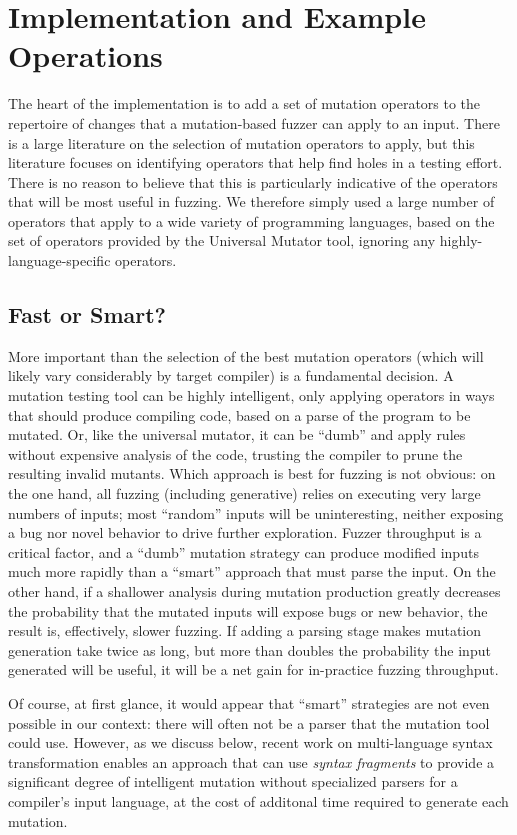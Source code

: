 \section{Implementation and Example Operations}

The heart of the implementation is to add a set of mutation operators
to the repertoire of changes that a mutation-based fuzzer can apply to
an input.  There is a large literature on the selection of mutation
operators to apply, but this literature focuses on identifying
operators that help find holes in a testing effort.  There is no
reason to believe that this is particularly indicative of the
operators that will be most useful in fuzzing.  We therefore simply
used a large number of operators that apply to a wide variety of
programming languages, based on the set of operators provided by the
Universal Mutator tool, ignoring any highly-language-specific operators.

\subsection{Fast or Smart?}

More important than the selection of the best mutation operators
(which will likely vary considerably by target compiler) is a
fundamental decision.  A mutation testing tool can be highly intelligent, only
applying operators in ways that should produce compiling code, based
on a parse of the program to be mutated.  Or, like the universal
mutator, it can be ``dumb'' and apply rules without expensive analysis
of the code, trusting the compiler to prune the resulting invalid
mutants.  Which approach is best for fuzzing is not obvious: on the
one hand, all fuzzing (including generative) relies on executing very
large numbers of inputs; most ``random'' inputs will be uninteresting,
neither exposing a bug nor novel behavior to drive further
exploration.  Fuzzer throughput is a critical factor, and a ``dumb''
mutation strategy can produce modified inputs much more rapidly than a
``smart'' approach that must parse the input.  On the other hand, if a
shallower analysis during mutation production greatly decreases the
probability that the mutated inputs will expose bugs or new behavior,
the result is, effectively, slower fuzzing.  If adding a parsing stage
makes mutation generation take twice as long, but more than doubles
the probability the input generated will be useful, it will be a net
gain for in-practice fuzzing throughput.

Of course, at first
glance, it would appear that  ``smart'' strategies are not even
possible in our context: there will often not be a parser that the
mutation tool could use.  However, as we discuss below, recent work on
multi-language syntax transformation enables an approach that can use
\emph{syntax fragments} to provide a significant degree of intelligent
mutation without specialized parsers for a compiler's input language,
at the cost of additonal time required to generate each mutation.

